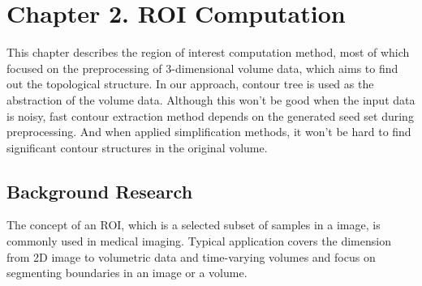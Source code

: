 \documentclass[11pt, b5paper]{report}
\begin{document}
% 
\chapter*{Chapter 2. ROI Computation}
\setcounter{tocdepth}{0}
\setcounter{chapter}{2}
\setcounter{section}{0}
\label{ch:preworks}

This chapter describes the region of interest computation method, most of 
which focused on the preprocessing of 3-dimensional
volume data, which aims to find out the topological structure. 
In our approach, contour tree is used as the abstraction of the 
volume data. Although this won't be
good when the input data is noisy, fast contour extraction method depends
on the generated seed set during preprocessing. And when applied 
simplification methods, it won't be hard to find significant contour 
structures in the original volume.



\section{Background Research}

The concept of an ROI, which is a selected subset of samples in a image, 
is commonly used in medical imaging. Typical application covers
the dimension from 2D image to volumetric data and time-varying volumes
and focus on segmenting boundaries in an image or a volume.

\end{document}
